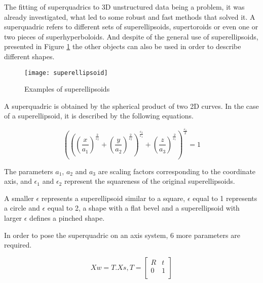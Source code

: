 The fitting of superquadrics to 3D unstructured data being a problem, it was already investigated, what led to some robust and fast methods that solved it. A superquadric refers to different sets of superellipsoids, supertoroids or even one or two pieces of superhyperboloids. And despite of the general use of superellipsoids, presented in Figure \ref{fig:superellipsoids} the other objects can also be used in order to describe different shapes.

\begin{figure}[H]
\begin{center}
    \leavevmode
    \texttt{[image: superellipsoid]}
    \caption[Examples of superellipsoids]{Examples of superellipsoids \protect\footnotemark}
    \label{fig:superellipsoids}
  \end{center}
\end{figure}

A superquadric is obtained by the spherical product of two 2D curves. In the case of a superellipsoid, it is described by the following equations.

\begin{equation}
\left ( \left ( \left ( \frac{x}{a_1} \right )^{\frac{2}{\varepsilon_2}} + \left ( \frac{y}{a_2} \right )^\frac{2}{\varepsilon_2} \right )^\frac{\varepsilon_2}{\varepsilon_1} + \left ( \frac{z}{a_3} \right ) ^\frac{2}{\varepsilon_1} \right ) ^ \frac{\varepsilon_1}{2} = 1
\end{equation}

The parameters $a_1$, $a_2$ and $a_3$ are scaling factors corresponding to the coordinate axis, and $\epsilon_1$ and $\epsilon_2$ represent the squareness of the original superellipsoids.

A smaller $\epsilon$ represents a superellipsoid similar to a square, $\epsilon$ equal to 1 represents a circle and $\epsilon$ equal to 2, a shape with a flat bevel and a superellipsoid with larger $\epsilon$ defines a pinched shape.

In order to pose the superquadric on an axis system, 6 more parameters are required.

\begin{equation}
Xw=T.Xs, T= 
\begin{bmatrix}
R&t\\
0&1\\
\end{bmatrix}
\end{equation}

